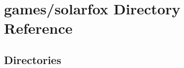 \section{games/solarfox Directory Reference}
\label{dir_2f9bf7e2c0f75733d5dba5ebfd2930c2}
\subsection*{Directories}
\begin{DoxyCompactItemize}
\end{DoxyCompactItemize}
